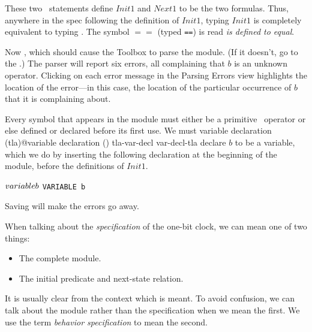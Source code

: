 \documentclass[fleqn,leqno]{article}
\begin{document}
These two \tlaplus\ statements define $Init1$ and $Next1$ to be the
two formulas.  Thus, anywhere in the spec following the definition of
$Init1$, typing $Init1$ is completely equivalent to typing
.  The symbol $\!==\!$ (typed \verb|==|) is
read \emph{is defined to equal}.

Now , which should cause the
Toolbox to parse the module.  (If it doesn't, go to the
.)  The
parser will report six errors, all complaining that $b$ is an unknown
operator.  Clicking on each error message in the \textsf{Parsing
Errors} view highlights the location of the error---in this case, the
location of the particular occurrence of $b$ that it is complaining
about.

Every symbol that appears in the module must either be a
primitive \tlaplus\ operator or else defined or declared before its
first use.  We must 
   {variable declaration (tla)@variable declaration ()}%
   {tla-var-decl}%
   {var-decl-tla}%
declare $b$ to be a variable, which we do by
inserting the following declaration at the beginning of the module,
before the definitions of $Init1$.%
\begin{display}
\begin{twocols}
$\VARIABLE b$ %
\midcol \verb|VARIABLE b|
\end{twocols}
\end{display}
Saving 
will make the errors go away.

\pause
%
\noindent
%
When talking about the 
\emph{specification} of the one-bit clock, we
can mean one of two things:
\begin{itemize}
\item The complete module.  

\item The initial predicate and next-state relation.
\end{itemize}
It is usually clear from the context which is meant.  To avoid
confusion, we can talk about the module rather than the specification
when we mean the first.  We use the term
\emph{behavior specification} to mean the second.
\end{document}
